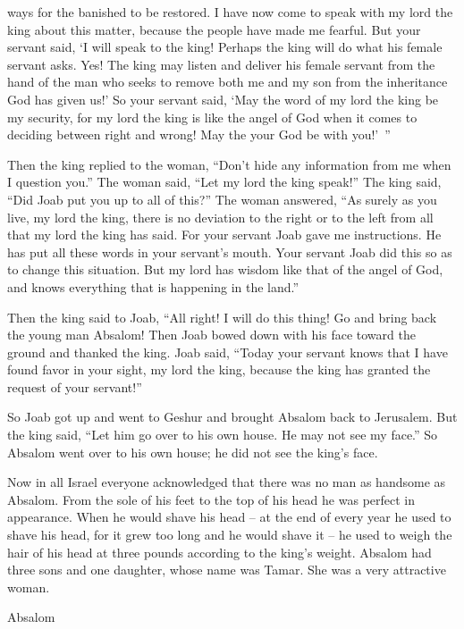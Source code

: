 {ways
for the banished
to be restored.
I have now
come
to speak
with my lord
the king
about this
matter,
because
the people
have made me fearful.
But your servant
said, ‘I will speak
to
the king! Perhaps
the king
will do
what
his female servant asks.
Yes! The king
may listen
and deliver
his female servant
from the hand
of the man
who seeks
to remove both
me and my son
from the inheritance
God has given us!’
So your servant
said,
‘May
the word
of my lord
the king
be my security,
for
my lord
the king
is like
the angel
of God
when it comes to deciding
between right
and wrong! May the
{}
your God
be
with you!’ ”
\par }{\PP {}Then
the king
replied
to
the woman,
“Don’t
hide
any
information
from
me when
I
question
you.” The woman
said,
“Let
my lord
the king
speak!”
The king
said,
“Did Joab
put you up to
all
of this?” The woman
answered,
“As surely
as you live,
my lord
the king,
there is no
deviation to the right
or to the left
from all
that
my lord
the king
has said.
For
your servant
Joab
gave
me instructions.
He
has put
all
these
words
in your servant’s
mouth.
Your servant
Joab
did
this
so as to
change
this situation.
But my lord
has wisdom
like that of the angel
of God,
and knows
everything
that
is happening in the land.”
\par }{\PP {}Then the king
said
to
Joab,
“All right! I will do
this
thing! Go
and bring back
the young man
Absalom!
Then
Joab
bowed
down with his face
toward the
ground
and thanked
the king.
Joab
said,
“Today
your servant
knows
that
I have found
favor
in your sight,
my lord
the king,
because
the king
has granted the request
of your servant!”
\par }{\PP {}So Joab
got up
and went
to Geshur
and brought
Absalom
back to Jerusalem.
But the king
said,
“Let him go over
to
his own house.
He may not
see
my face.”
So Absalom
went over
to
his own house;
he did not
see
the king’s
face.
\par }{\PP {}Now in all
Israel
everyone acknowledged
that there was
no
man
as handsome
as Absalom.
From the sole
of his feet
to
the top of
his head
he was
perfect in appearance.
When he would shave
his head
– at the end
of every year
he used to shave
his head, for
it grew too long
and he would shave it – he used to weigh the hair of his head at three pounds according to the king’s weight.
Absalom
had
three
sons
and one
daughter,
whose name
was Tamar.
She
was
a very attractive
woman.
\par }{\PP {}Absalom
}
